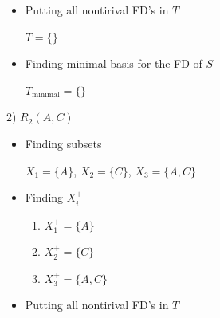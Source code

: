 \documentclass[12pt]{article}
\begin{document}
\begin{enumerate}[1.]
\begin{itemize}
\begin{itemize}
\begin{enumerate}[1.]
\begin{itemize}
                    \color{black}
                    \item Putting all nontirival FD's in $T$

                    \color{red}

                    $T = \{\}$

                    \color{black}

                    \item Finding minimal basis for the FD of $S$

                    \color{red}

                    $T_{\text{minimal}} = \{\}$

                    \color{black}

                \end{itemize}

                \bigskip

                2) \color{red}$R_2(A,C)$\color{black}

                \bigskip

                \begin{itemize}
                    \item Finding subsets

                    \bigskip
                    \color{red}

                        $X_1 = \{A\}$,
                        $X_2 = \{C\}$,
                        $X_3 = \{A,C\}$

                    \color{black}
                    \bigskip

                    \item Finding $X_i^+$

                    \bigskip
                    \color{red}

                    \begin{enumerate}[1.]
                        \item $X_1^+ = \{A\}$
                        \item $X_2^+ = \{C\}$
                        \item $X_3^+ = \{A,C\}$
                    \end{enumerate}

                    \color{black}
                    \item Putting all nontirival FD's in $T$

                    \color{red}


\end{itemize}
\end{enumerate}
\end{itemize}
\end{itemize}
\end{enumerate}
\end{document}
